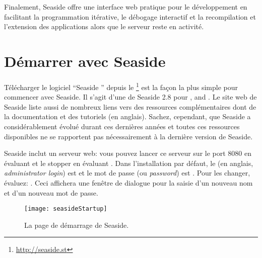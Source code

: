 \documentclass[a4paper,10pt,twoside]{book}
\begin{document}
Finalement, Seaside offre une interface web pratique pour le
développement en facilitant la programmation itérative, le débogage
interactif et la recompilation et l'extension des applications alors
que le serveur reste en activité.

\section{Démarrer avec Seaside}

Télécharger le logiciel ``Seaside '' depuis le \footnote{\url{http://seaside.st}} est la façon la plus simple
pour commencer avec Seaside.
Il s'agit d'une 
de Seaside 2.8 pour ,  and .
Le site web de Seaside liste aussi de nombreux liens vers des
ressources complémentaires dont de la documentation et des
tutoriels (en anglais).
Sachez, cependant, que Seaside a considérablement évolué durant ces
dernières années et toutes ces ressources disponibles ne se rapportent
pas nécessairement à la dernière version de Seaside.


Seaside inclut un serveur web: vous pouvez lancer ce serveur sur le
port 8080 en évaluant   et le stopper
en évaluant .
Dans l'installation par défaut, le  (en anglais, \emph{administrator login}) est
 et le mot de passe (ou \emph{password}) est .
Pour les changer, évaluez: 
  .
Ceci affichera une fenêtre de dialogue pour la saisie d'un nouveau nom
et d'un nouveau mot de passe. 

\begin{figure}[tbh]
\begin{center}
\texttt{[image: seasideStartup]}
\caption{La page de démarrage de Seaside.}
\end{center}
\end{figure}
\end{document}
